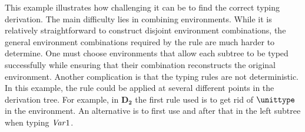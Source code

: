 This example illustrates how challenging it can be to find the correct typing derivation. The main difficulty lies in combining environments. While it is relatively straightforward to construct disjoint environment combinations, the general environment combinations required by the \LET rule are much harder to determine. One must choose environments that allow each subtree to be typed successfully while ensuring that their combination reconstructs the original environment. Another complication is that the typing rules are not deterministic. In this example, the \SUB rule could be applied at several different points in the derivation tree.
For example, in $\mathbf{D_2}$ the first rule used is \SUB to get rid of $\unittype$ in the environment.
An alternative is to first use \GUARD and after that \SUB in the left subtree when typing ${\it Var}{1}$.

